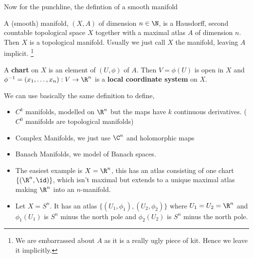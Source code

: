 \noindent
Now for the punchline, the defintion of a smooth manifold
\begin{ndefi}
  A (smooth) manifold, $(X, A)$ of dimension $n \in \N$, is a Hausdorff, second countable topological space $X$ together with a maximal atlas $A$ of dimension $n$. Then $X$ is a topological manifold. Usually we just call $X$ the manifold, leaving $A$ implicit. \footnote{We are embarrassed about $A$ as it is a really ugly piece of kit. Hence we leave it implicitly.}
\end{ndefi}

\noindent
A \textbf{chart} on $X$ is an element of $(U, \phi)$ of $A$. Then $V = \phi(U)$ is open in $X$ and $\phi^{-1} = (x_1, \dots, x_n) : V \to \R^n$ is a \textbf{local coordinate system} on $X$.

\begin{remark}
   We can use basically the same definition to define,
   \begin{itemize}
     \item $C^k$ manifolds, modelled on $\R^n$ but the maps have $k$ continuous derivatives. ($C^0$ manifolds are topological manifolds)
     \item Complex Manifolds, we just use $\C^n$ and holomorphic maps
     \item Banach Manifolds, we model of Banach spaces.
   \end{itemize}
\end{remark}

\begin{eg}
  \begin{itemize}
    \item The easiest example is $X = \R^n$, this has an atlas consisting of one chart $\{(\R^n, \id)\}$, which isn't maximal but extends to a unique maximal atlas making $\R^n$ into an $n$-manifold.
    \item Let $X = S^n$. It has an atlas $\{(U_1, \phi_1), (U_2, \phi_2)\}$ where $U_1 = U_2 = \R^n$ and $\phi_1(U_1)$ is $S^n$ minus the north pole and $\phi_2(U_2)$ is $S^n$ minus the north pole.
  \end{itemize}
\end{eg}


